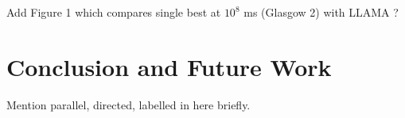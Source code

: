 \documentclass{llncs}
\begin{document}
Add Figure 1 which compares single best at $10^8$ ms (Glasgow 2) with LLAMA ?

\section{Conclusion and Future Work}

Mention parallel, directed, labelled in here briefly.



\end{document}
